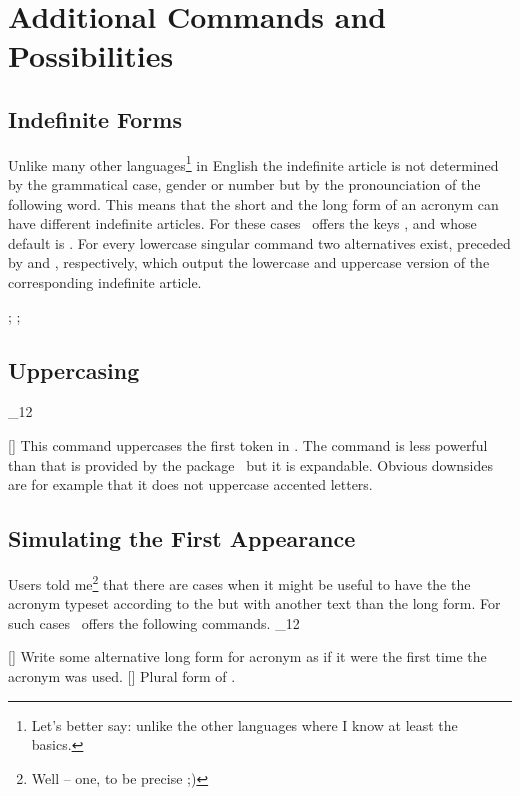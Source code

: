 \documentclass[load-preamble+]{cnltx-doc}
\makeatletter
\renewenvironment{commands}
  {%
    \cnltx@set@catcode_{12}%
    \let\command\cnltx@command
    \cnltxlist
  }
  {\endcnltxlist}
\makeatother
\begin{document}
\section{Additional Commands and Possibilities}
\subsection{Indefinite Forms}
\noindent{}%
Unlike many other languages\footnote{Let's better say: unlike the other
  languages where I know at least the basics.} in English the indefinite
article is not determined by the grammatical case, gender or number but by the
pronounciation of the following word.  This means that the short and the long
form of an acronym can have different indefinite articles.  For these cases
\acro\ offers the keys ,  and
 whose default is .  For every lowercase
singular command two alternatives exist, preceded by  and ,
respectively, which output the lowercase and uppercase version of the
corresponding indefinite article.

\begin{example}
  ; ; 
\end{example}

\subsection{Uppercasing}
\begin{commands}
  \command{acfirstupper}[]
     This command uppercases the first token in .  The command is less powerful than  that is
     provided by the  package~\cite{pkg:mfirstuc} but it is
     expandable.  Obvious downsides are for example that it does not uppercase
     accented letters.
\end{commands}

\subsection{Simulating the First Appearance}
\noindent{}%
Users told me\footnote{Well -- one, to be precise ;)} that there are cases
when it might be useful to have the the acronym typeset according to the
 but with another text than the long form.  For such cases
\acro\ offers the following commands.
\begin{commands}
  \command{acflike}[\sarg{}]
    Write some alternative long form for acronym  as if it were the
    first time the acronym was used.
  \command{acfplike}[\sarg{}]
    Plural form of .
\end{commands}
\end{document}
